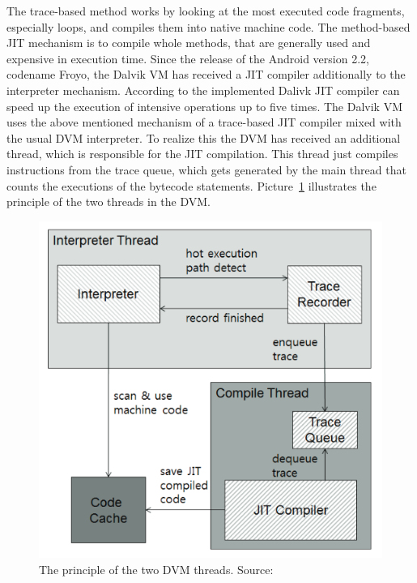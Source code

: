 The trace-based method works by looking at the most executed code fragments, especially loops, and compiles them into native machine code.
The method-based JIT mechanism is to compile whole methods, that are generally used and expensive in execution time.
Since the release of the Android version 2.2, codename Froyo, the Dalvik VM has received a JIT compiler additionally to the interpreter mechanism.
According to \cite{cheng2010jit} the implemented Dalivk JIT compiler can speed up the execution of intensive operations up to five times.
The Dalvik VM uses the above mentioned mechanism of a trace-based JIT compiler mixed with the usual DVM interpreter.
To realize this the DVM has received an additional thread, which is responsible for the JIT compilation.
This thread just compiles instructions from the trace queue, which gets generated by the main thread that counts the executions of the bytecode statements.\cite{oh2012evaluation}
Picture~\ref{fig:dvm-threads} illustrates the principle of the two threads in the DVM.
\begin{figure}[h]
\begin{center}
\includegraphics[scale=0.5]{images/dvm-threads.png} 
\caption{The principle of the two DVM threads. Source:\cite{oh2012evaluation}}
\label{fig:dvm-threads}
\end{center}
\end{figure}

